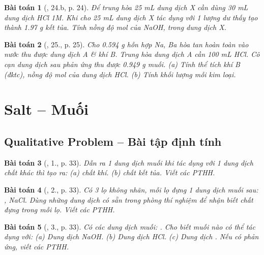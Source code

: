 \documentclass{article}
\newtheorem{baitoan}{Bài toán}
\begin{document}
\begin{baitoan}[\cite{An_350_BT_Hoa_Hoc_9}, 24.b, p. 24]
	Để trung hòa \emph{25 mL} dung dịch X cần dùng \emph{30 mL} dung dịch \emph{HCl 1M}. Khi cho \emph{25 mL} dung dịch X tác dụng với 1 lượng dư \emph{} thấy tạo thành \emph{1.97 g} kết tủa. Tính nồng độ mol của \emph{NaOH, } trong dung dịch X.
\end{baitoan}

\begin{baitoan}[\cite{An_350_BT_Hoa_Hoc_9}, 25., p. 25]
	Cho \emph{0.594 g} hỗn hợp \emph{Na, Ba} hòa tan hoàn toàn vào nước thu được dung dịch A \& khí B. Trung hòa dung dịch A cần \emph{100 mL HCl}. Cô cạn dung dịch sau phản ứng thu được \emph{0.949 g} muối. (a) Tính thể tích khí B (đktc), nồng độ mol của dung dịch \emph{HCl}. (b) Tính khối lượng mỗi kim loại.
\end{baitoan}


\section{Salt -- Muối}

\subsection{Qualitative Problem -- Bài tập định tính}

\begin{baitoan}[\cite{SGK_Hoa_Hoc_9}, 1., p. 33]
	Dẫn ra 1 dung dịch muối khi tác dụng với 1 dung dịch chất khác thì tạo ra: (a) chất khí. (b) chất kết tủa. Viết các PTHH.
\end{baitoan}

\begin{baitoan}[\cite{SGK_Hoa_Hoc_9}, 2., p. 33]
	Có 3 lọ không nhãn, mỗi lọ đựng 1 dung dịch muối sau: \emph{, NaCl}. Dùng những dung dịch có sẵn trong phòng thí nghiệm để nhận biết chất đựng trong mỗi lọ. Viết các PTHH.
\end{baitoan}

\begin{baitoan}[\cite{SGK_Hoa_Hoc_9}, 3., p. 33]
	Có các dung dịch muối: \emph{}. Cho biết muối nào có thể tác dụng với: (a) Dung dịch \emph{NaOH}. (b) Dung dịch \emph{HCl}. (c) Dung dịch \emph{}. Nếu có phản ứng, viết các PTHH.
\end{baitoan}
\end{document}
